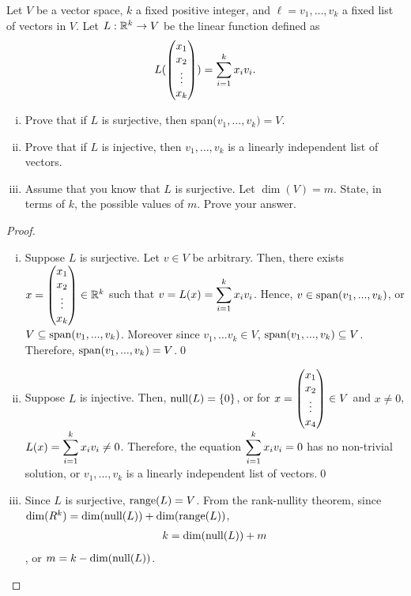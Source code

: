 \begin{question}\label{que:CoordinateFunction}
	\normalfont
	
		
	Let $V$ be a vector space, $k$ a fixed positive integer, and $\ell = v_1,\dots, v_k$ a fixed list of vectors in $V$. Let $L:{\mathbb R}^k\to V$ be the linear function defined as
	\begin{align}\label{eq:LCoordinateMap}
		L(\begin{pmatrix} x_1\\ x_2\\\vdots \\ x_k\end{pmatrix}) = \sum_{i=1}^k x_iv_i.
	\end{align}
	
	\begin{enumerate}[(i)]
		\item Prove that if $L$ is surjective, then span($v_1,\dots, v_k) = V$.
		
		\item Prove that if $L$ is injective, then $v_1,\dots, v_k$ is a linearly independent list of vectors.
		
		\item Assume that you know that $L$ is surjective.  Let $\dim(V)=m$. State, in terms of $k$, the possible values of $m$.  Prove your answer.
		
		
	\end{enumerate}
\end{question}

\begin{proof}
    \renewcommand{\qedsymbol}{$\blacksquare$}
    \begin{enumerate}[(i)]
        \item Suppose $L$ is surjective. Let $v\in V$ be arbitrary.
        Then, there exists $x=\begin{pmatrix} x_1\\ x_2\\\vdots \\ x_k\end{pmatrix}\in\mathbb R^k$ such that $v=L(x)=\mathlarger{\sum_{i=1}^{k}x_iv_i}$. Hence, $v\in\textnormal{span}(v_1,...,v_k)$, or $V\subseteq\textnormal{span}(v_1,...,v_k)$.
        Moreover since $v_1,...v_k\in V$, $\textnormal{span}(v_1,...,v_k)\subseteq V$.
        Therefore, $\textnormal{span}(v_1,...,v_k)=V$.\qed

        \item Suppose $L$ is injective.
        Then, $\textnormal{null}(L)=\{0\}$, or for $x=\begin{pmatrix} x_1\\ x_2\\\vdots \\ x_4\end{pmatrix}\in V$ and $x\not=0$, $L(x)=\mathlarger{\sum_{i=1}^{k}x_iv_i}\not= 0$. 
        Therefore, the equation $\mathlarger{\sum_{i=1}^{k}x_iv_i}=0$ has no non-trivial solution, or $v_1,...,v_k$ is a linearly independent list of vectors.\qed

        \item Since $L$ is surjective, $\textnormal{range}(L)=V$. From the rank-nullity theorem, since $\textnormal{dim}(R^k)=\textnormal{dim}(\textnormal{null}(L))+\textnormal{dim}(\textnormal{range}(L))$, 
        \[
            \begin{aligned}
                k=\textnormal{dim}(\textnormal{null}(L))+m
            \end{aligned}
        \]
        , or $m=k-\textnormal{dim}(\textnormal{null}(L))$.
        
    \end{enumerate}

\end{proof}